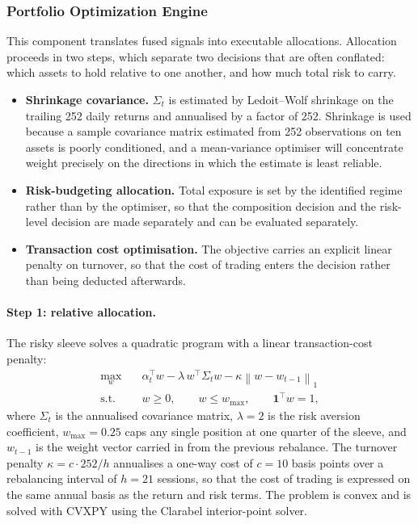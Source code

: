 \subsubsection{Portfolio Optimization Engine}

This component translates fused signals into executable allocations. Allocation proceeds
in two steps, which separate two decisions that are often conflated: which assets to hold
relative to one another, and how much total risk to carry.

\begin{itemize}
\item \textbf{Shrinkage covariance.} $\Sigma_t$ is estimated by Ledoit--Wolf shrinkage
\citep{ledoit04} on the trailing 252 daily returns and annualised by a factor of 252.
Shrinkage is used because a sample covariance matrix estimated from 252 observations on
ten assets is poorly conditioned, and a mean-variance optimiser will concentrate weight
precisely on the directions in which the estimate is least reliable.
\item \textbf{Risk-budgeting allocation.} Total exposure is set by the identified regime
rather than by the optimiser, so that the composition decision and the risk-level
decision are made separately and can be evaluated separately.
\item \textbf{Transaction cost optimisation.} The objective carries an explicit linear
penalty on turnover, so that the cost of trading enters the decision rather than being
deducted afterwards.
\end{itemize}

\paragraph{Step 1: relative allocation.} The risky sleeve solves a quadratic program with
a linear transaction-cost penalty:
\begin{align}
\max_{w} \quad & \alpha_t^{\top} w - \lambda \, w^{\top} \Sigma_t w
- \kappa \left\| w - w_{t-1} \right\|_1 \\
\text{s.t.} \quad & w \geq 0, \qquad w \leq w_{\max}, \qquad \mathbf{1}^{\top} w = 1,
\end{align}
where $\Sigma_t$ is the annualised covariance matrix, $\lambda = 2$ is the risk aversion
coefficient, $w_{\max} = 0.25$ caps any single position at one quarter of the sleeve, and
$w_{t-1}$ is the weight vector carried in from the previous rebalance. The turnover
penalty $\kappa = c \cdot 252 / h$ annualises a one-way cost of $c = 10$ basis points
over a rebalancing interval of $h = 21$ sessions, so that the cost of trading is expressed
on the same annual basis as the return and risk terms. The problem is convex and is
solved with CVXPY using the Clarabel interior-point solver.

